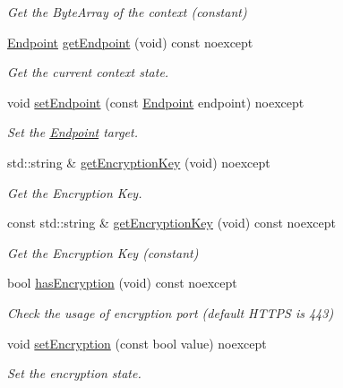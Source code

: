 \begin{DoxyCompactItemize}
\begin{DoxyCompactList}\small\item\em Get the Byte\+Array of the context (constant) \end{DoxyCompactList}\item 
\mbox{\hyperlink{classo_z_1_1_endpoint}{Endpoint}} \mbox{\hyperlink{classo_z_1_1_packet_a89367cc491fdfdb6bf88eda9bc4eb219}{get\+Endpoint}} (void) const noexcept
\begin{DoxyCompactList}\small\item\em Get the current context\textquotesingle{} state. \end{DoxyCompactList}\item 
void \mbox{\hyperlink{classo_z_1_1_packet_a2bcd9f2d612cbc1b59a8b7c99d706908}{set\+Endpoint}} (const \mbox{\hyperlink{classo_z_1_1_endpoint}{Endpoint}} endpoint) noexcept
\begin{DoxyCompactList}\small\item\em Set the \mbox{\hyperlink{classo_z_1_1_endpoint}{Endpoint}} target. \end{DoxyCompactList}\item 
std\+::string \& \mbox{\hyperlink{classo_z_1_1_packet_a93abca1901de8784297e53e2a92dc810}{get\+Encryption\+Key}} (void) noexcept
\begin{DoxyCompactList}\small\item\em Get the Encryption Key. \end{DoxyCompactList}\item 
const std\+::string \& \mbox{\hyperlink{classo_z_1_1_packet_a71f6029e78232544fd48761de456719a}{get\+Encryption\+Key}} (void) const noexcept
\begin{DoxyCompactList}\small\item\em Get the Encryption Key (constant) \end{DoxyCompactList}\item 
bool \mbox{\hyperlink{classo_z_1_1_packet_abf9bd4979afb439272832d5a90f7d556}{has\+Encryption}} (void) const noexcept
\begin{DoxyCompactList}\small\item\em Check the usage of encryption port (default H\+T\+T\+PS is 443) \end{DoxyCompactList}\item 
void \mbox{\hyperlink{classo_z_1_1_packet_a7c6fc3f9ca25adf83be8e7c1f5ae5b70}{set\+Encryption}} (const bool value) noexcept
\begin{DoxyCompactList}\small\item\em Set the encryption state. \end{DoxyCompactList}\end{DoxyCompactItemize}


